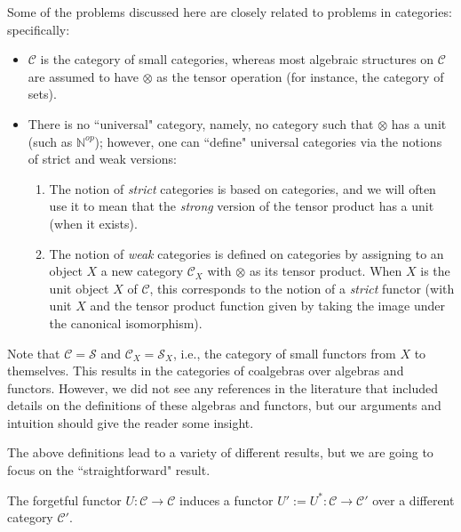 \documentclass[a4paper,reqno,oneside]{article}
\begin{document}
Some of the problems discussed here are closely related to problems in categories: specifically:
\begin{itemize}[leftmargin=-0.6cm]
    \item $\mathcal{C}$ is the category of small categories, whereas most algebraic structures on $\mathcal{C}$ are assumed to have $\otimes$ as the tensor operation (for instance, the category of sets).
    \item There is no ``universal" category, namely, no category such that $\otimes$ has a unit (such as $\mathbb{N}^{op}$); however, one can ``define" universal categories via the notions of strict and weak versions: 
    \begin{enumerate}[leftmargin=*]
        \item The notion of \textit{strict} categories is based on categories, and we will often use it to mean that the \textit{strong} version of the tensor product has a unit (when it exists).
        \item The notion of \textit{weak} categories is defined on categories by assigning to an object $X$ a new category $\mathcal{C}_X$ with $\otimes$ as its tensor product. When $X$ is the unit object $X$ of $\mathcal{C}$, this corresponds to the notion of a \textit{strict} functor (with unit $X$ and the tensor product function given by taking the image under the canonical isomorphism).
    \end{enumerate}
\end{itemize}
Note that $\mathcal{C} = \mathcal{S}$ and $\mathcal{C}_{X} = \mathcal{S}_X$, i.e., the category of small functors from $X$ to themselves. This results in the categories of coalgebras over algebras and functors. However, we did not see any references in the literature that included details on the definitions of these algebras and functors, but our arguments and intuition should give the reader some insight.

The above definitions lead to a variety of different results, but we are going to focus on the ``straightforward" result.

\begin{theorem}
    The forgetful functor $U \colon \mathcal{C} \to \mathcal{C}$ induces a functor $U' := U^\ast: \mathcal{C} \to \mathcal{C}'$ over a different category $\mathcal{C}'$.
\end{theorem}
\end{document}
